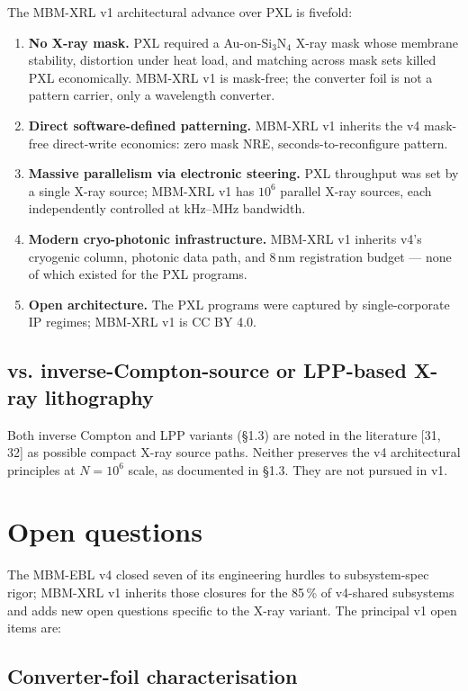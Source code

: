 \documentclass[11pt,letterpaper]{article}
\begin{document}
The MBM-XRL v1 architectural advance over PXL is fivefold:

\begin{enumerate}[leftmargin=1.6em]
  \item \textbf{No X-ray mask.} PXL required a Au-on-Si$_3$N$_4$ X-ray mask whose membrane stability, distortion under heat load, and matching across mask sets killed PXL economically. MBM-XRL v1 is mask-free; the converter foil is not a pattern carrier, only a wavelength converter.
  \item \textbf{Direct software-defined patterning.} MBM-XRL v1 inherits the v4 mask-free direct-write economics: zero mask NRE, seconds-to-reconfigure pattern.
  \item \textbf{Massive parallelism via electronic steering.} PXL throughput was set by a single X-ray source; MBM-XRL v1 has $10^6$ parallel X-ray sources, each independently controlled at kHz--MHz bandwidth.
  \item \textbf{Modern cryo-photonic infrastructure.} MBM-XRL v1 inherits v4's cryogenic column, photonic data path, and 8\,nm registration budget --- none of which existed for the PXL programs.
  \item \textbf{Open architecture.} The PXL programs were captured by single-corporate IP regimes; MBM-XRL v1 is CC BY 4.0.
\end{enumerate}

\subsection{vs. inverse-Compton-source or LPP-based X-ray lithography}

Both inverse Compton and LPP variants (\S 1.3) are noted in the literature [31, 32] as possible compact X-ray source paths. Neither preserves the v4 architectural principles at $N = 10^6$ scale, as documented in \S 1.3. They are not pursued in v1.

\section{Open questions}

The MBM-EBL v4 closed seven of its engineering hurdles to subsystem-spec rigor; MBM-XRL v1 inherits those closures for the 85\,\% of v4-shared subsystems and adds new open questions specific to the X-ray variant. The principal v1 open items are:

\subsection{Converter-foil characterisation}
\end{document}
